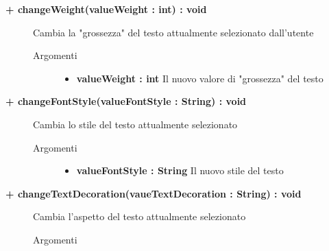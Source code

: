 \begin{description}
	\begin{description}
		\item[\textbf{\color{blue}+ changeWeight(valueWeight : int) : void	 	}] \hfill
			Cambia la "grossezza" del testo attualmente selezionato dall'utente
			
		\begin{description}
			\item[Argomenti] \hfill
				\begin{itemize}
				
					\item \textbf{valueWeight : int	} \hfill
					Il nuovo valore di "grossezza" del testo
				\end{itemize}
				
		\end{description}
	\end{description}
	
	\begin{description}
		\item[\textbf{\color{blue}+ changeFontStyle(valueFontStyle : String) : void	 	}] \hfill
		Cambia lo stile del testo attualmente selezionato
			
		\begin{description}
			\item[Argomenti] \hfill
				\begin{itemize}
				
					\item \textbf{valueFontStyle : String} \hfill
					Il nuovo stile del testo
				\end{itemize}
				
		\end{description}
	\end{description}
	
	\begin{description}
		\item[\textbf{\color{blue}+ changeTextDecoration(vaueTextDecoration : String) : void	 	}] \hfill
		Cambia l'aspetto del testo attualmente selezionato
			
		\begin{description}
			\item[Argomenti] \hfill
				\begin{itemize}
				

\end{itemize}
\end{description}
\end{description}
\end{description}
